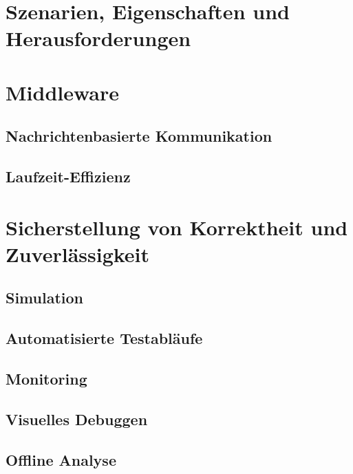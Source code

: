 \documentclass[a4paper, 11pt, accentcolor = tud3b]{tudreport}
\begin{document}
		\section{Szenarien, Eigenschaften und Herausforderungen} %

		\section{Middleware} %

			\subsection{Nachrichtenbasierte Kommunikation} %

			\subsection{Laufzeit-Effizienz} %

		\section{Sicherstellung von Korrektheit und Zuverlässigkeit} %

			\subsection{Simulation} %

			\subsection{Automatisierte Testabläufe} %

			\subsection{Monitoring} %

			\subsection{Visuelles Debuggen} %

			\subsection{Offline Analyse} %
\end{document}
